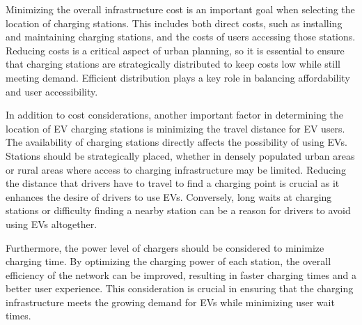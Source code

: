 \documentclass[12pt]{report}
\begin{document}
Minimizing the overall infrastructure cost is an important goal when selecting the location of charging stations. This includes both direct costs, such as installing and maintaining charging stations, and the costs of users accessing those stations. Reducing costs is a critical aspect of urban planning, so it is essential to ensure that charging stations are strategically distributed to keep costs low while still meeting demand. Efficient distribution plays a key role in balancing affordability and user accessibility.

In addition to cost considerations, another important factor in determining the location of EV charging stations is minimizing the travel distance for EV users. The availability of charging stations directly affects the possibility of using EVs. Stations should be strategically placed, whether in densely populated urban areas or rural areas where access to charging infrastructure may be limited. Reducing the distance that drivers have to travel to find a charging point is crucial as it enhances the desire of drivers to use EVs. Conversely, long waits at charging stations or difficulty finding a nearby station can be a reason for drivers to avoid using EVs altogether.

Furthermore, the power level of chargers should be considered to minimize charging time. By optimizing the charging power of each station, the overall efficiency of the network can be improved, resulting in faster charging times and a better user experience. This consideration is crucial in ensuring that the charging infrastructure meets the growing demand for EVs while minimizing user wait times.
\end{document}
